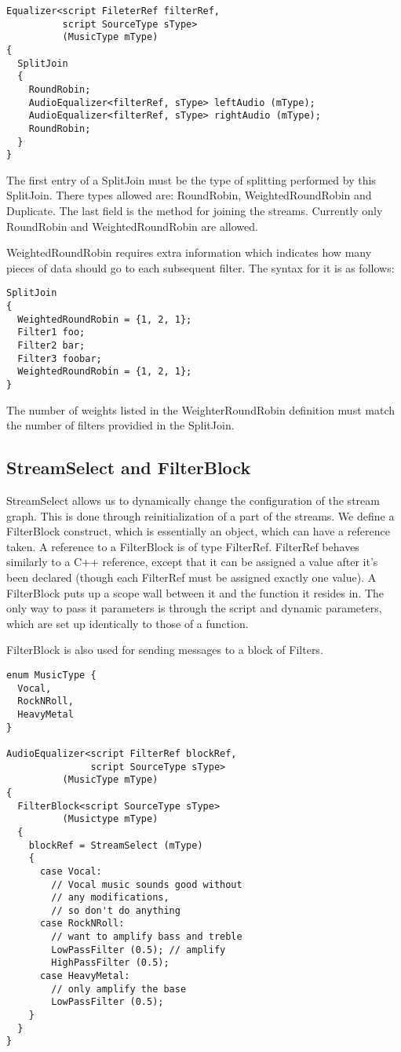 \documentclass[twocolumn, draft]{article}
\begin{document}
\begin{verbatim}
Equalizer<script FileterRef filterRef,
          script SourceType sType>
          (MusicType mType)
{
  SplitJoin
  {
    RoundRobin;
    AudioEqualizer<filterRef, sType> leftAudio (mType);
    AudioEqualizer<filterRef, sType> rightAudio (mType);
    RoundRobin;
  }
}
\end{verbatim}

The first entry of a SplitJoin must be the type of splitting performed
by this SplitJoin.  There types allowed are:  RoundRobin, WeightedRoundRobin
and Duplicate.  The last field is the method for joining the streams.  
Currently only RoundRobin and WeightedRoundRobin are allowed.

WeightedRoundRobin requires extra information which indicates how many
pieces of data should go to each subsequent filter.  The syntax for it
is as follows:

\begin{verbatim}
SplitJoin
{
  WeightedRoundRobin = {1, 2, 1};
  Filter1 foo;
  Filter2 bar;
  Filter3 foobar;
  WeightedRoundRobin = {1, 2, 1};
}
\end{verbatim}

The number of weights listed in the WeighterRoundRobin definition must
match the number of filters providied in the SplitJoin.

\subsection{StreamSelect and FilterBlock}

StreamSelect allows us to dynamically change the configuration
of the stream graph.  This is done through reinitialization of 
a part of the streams.  We define a FilterBlock construct, which
is essentially an object, which can have a reference taken.
A reference to a FilterBlock is of type FilterRef.  FilterRef behaves similarly
to a C++ reference, except that it can be assigned a value after it's been
declared (though each FilterRef must be assigned exactly one value).
A FilterBlock puts up a scope wall between it and the function it
resides in.  The only way to pass it parameters is through the
script and dynamic parameters, which are set up identically to
those of a function.

FilterBlock is also used for sending messages to a block of Filters.

\begin{verbatim}
enum MusicType {
  Vocal,
  RockNRoll,
  HeavyMetal
}

AudioEqualizer<script FilterRef blockRef,
               script SourceType sType>
          (MusicType mType)
{
  FilterBlock<script SourceType sType>
          (Musictype mType)
  {
    blockRef = StreamSelect (mType)
    {
      case Vocal:
        // Vocal music sounds good without 
        // any modifications,
        // so don't do anything
      case RockNRoll:
        // want to amplify bass and treble
        LowPassFilter (0.5); // amplify
        HighPassFilter (0.5);
      case HeavyMetal:
        // only amplify the base
        LowPassFilter (0.5);
    }
  }
}
\end{verbatim}
\end{document}
